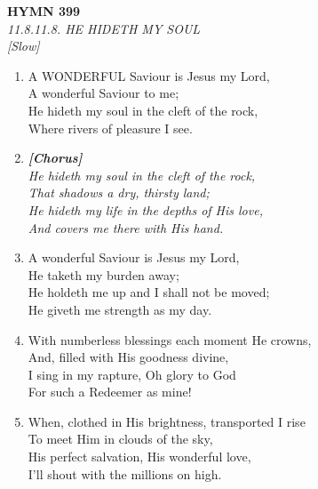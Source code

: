 \newpage
\begin{center}
    {\Large \textbf{HYMN 399}}
    \\
    \textit{11.8.11.8. HE HIDETH MY SOUL}
    \\
    \textit{\small [Slow]}
\end{center}
\vspace{1em}

\begin{enumerate}
    \item A WONDERFUL Saviour is Jesus my Lord, \\
        A wonderful Saviour to me; \\
        He hideth my soul in the cleft of the rock, \\
        Where rivers of pleasure I see.

    \item[] \vspace{0.4em}
    \textbf{\textit{[Chorus]}} \\
    \textit{He hideth my soul in the cleft of the rock,} \\
    \textit{That shadows a dry, thirsty land;} \\
    \textit{He hideth my life in the depths of His love,} \\
    \textit{And covers me there with His hand.}
    \vspace{0.4em}

    \item A wonderful Saviour is Jesus my Lord, \\
        He taketh my burden away; \\
        He holdeth me up and I shall not be moved; \\
        He giveth me strength as my day.

    \item With numberless blessings each moment He crowns, \\
        And, filled with His goodness divine, \\
        I sing in my rapture, Oh glory to God \\
        For such a Redeemer as mine!

    \item When, clothed in His brightness, transported I rise \\
        To meet Him in clouds of the sky, \\
        His perfect salvation, His wonderful love, \\
        I'll shout with the millions on high.

\end{enumerate}


